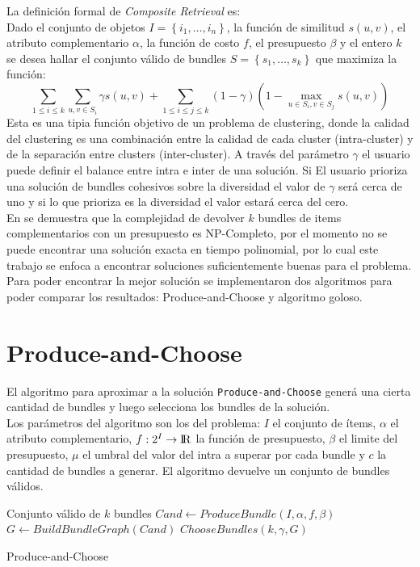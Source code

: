 La definición formal de \textit{Composite Retrieval} es:\\
Dado el conjunto de objetos $I = \left\{i_1, \ldots, i_n \right\}$, la función de similitud $s(u,v)$, el atributo complementario $\alpha$, la función de costo $f$, el presupuesto $\beta$ y el entero $k$ se desea hallar el conjunto válido de bundles $S = \left\{s_1, \ldots, s_k\right\}$ que maximiza la función:
\begin{equation} \label{des:eq-fnObj}
  \sum_{1 \leq i \leq k}{\sum_{u,v \in S_i}{\gamma s(u,v)}} + \sum_{1 \leq i \leq j \leq k}{(1-\gamma) (1-\max_{u \in S_i, v \in S_j}{s(u,v)})}
\end{equation}
Esta es una tipia función objetivo de un problema de clustering, donde la calidad del clustering es una combinación entre la calidad de cada cluster (intra-cluster) y de la separación entre clusters (inter-cluster). A través del parámetro $\gamma$ el usuario puede definir el balance entre intra e inter de una solución. Si El usuario prioriza una solución de bundles cohesivos sobre la diversidad el  valor de $\gamma$ será cerca de uno y si lo que prioriza es la diversidad el valor estará cerca del cero.\\
En \cite{compositeRetrival} se demuestra que la complejidad de devolver $k$ bundles de items complementarios con un presupuesto es NP-Completo, por el momento no se puede encontrar una solución exacta en tiempo polinomial, por lo cual este trabajo se enfoca a encontrar soluciones suficientemente buenas para el problema. Para poder encontrar la mejor solución se implementaron dos algoritmos para poder comparar los resultados: Produce-and-Choose y algoritmo goloso.

\section{Produce-and-Choose}
El algoritmo para aproximar a la solución \texttt{Produce-and-Choose} generá una cierta cantidad de bundles y luego selecciona los bundles de la solución.\\

Los parámetros del algoritmo son los del problema: $I$ el conjunto de ítems, $\alpha$ el atributo complementario, $f: 2^{I} \rightarrow \rm I \!R$ la función de presupuesto, $\beta$ el limite del presupuesto, $\mu$ el umbral del valor del intra a superar por cada bundle y $c$ la cantidad de bundles a generar. El algoritmo devuelve un conjunto de bundles válidos.\\
\begin{algorithm}[H]
\begin{algorithmic}[1]
\ENSURE Conjunto válido de $k$ bundles
\STATE $Cand \leftarrow ProduceBundle(I,\alpha,f,\beta)$
\STATE $G \leftarrow BuildBundleGraph(Cand)$
\RETURN $ChooseBundles(k,\gamma,G)$
\end{algorithmic}
\caption{Produce-and-Choose}\label{alg:PAC}
\end{algorithm}

